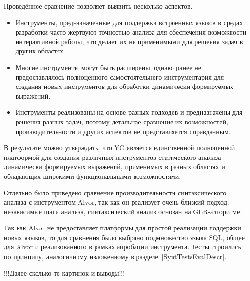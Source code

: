 Проведённое сравнение позволяет выявить несколько аспектов.
\begin{itemize}
    \item Инструменты, предназначенные для поддержки встроенных языков в средах разработки часто жертвуют точностью анализа для обеспечения возможности интерактивной работы, что делает их не применимыми для решения задач в других областях.
    \item Многие инструменты могут быть расширены, однако ранее не предоставлялось полноценного самостоятельного инструментария для создания новых инструментов для обработки динамически формируемых выражений.
    \item Инструменты реализованы на основе разных подходов и предназначены для решения разных задач, поэтому детальное сравнение их возможностей, производительности и других аспектов не представляется оправданным.
\end{itemize}

В результате можно утверждать, что YC является единственной полноценной платформой для создания различных инструментов статического анализа динамически формируемых выражений, применимых в разных областях и обладающих широкими функциональными возможностями.

Отдельно было приведено сравнение производительности синтаксического анализа с инструментом Alvor, так как он реализует очень близкий подход: независимые шаги анализа, синтаксический анализ основан на GLR-алгоритме.

Так как Alvor не предоставляет платформы для простой реализации поддержки новых языков, то для сравнения было выбрано подмножество языка SQL, общее для Alvor и реализованного в рамках апробации инструмента. Тесты строились по принципу, аналогичному изложенному в разделе~\ref{SyntTestsEvalDescr}.

!!!Далее сколько-то картинок и выводы!!!
